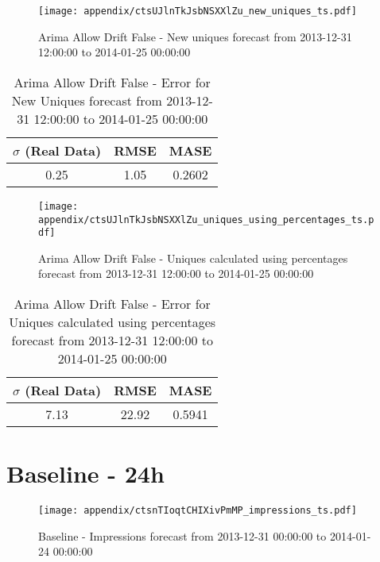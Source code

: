 \begin{figure}[H] \begin{center} \leavevmode
\texttt{[image: appendix/ctsUJlnTkJsbNSXXlZu\_new\_uniques\_ts.pdf]} \caption[]{
Arima Allow Drift False - New uniques forecast from 2013-12-31 12:00:00 to 2014-01-25 00:00:00} \label{fig:appendix/ctsUJlnTkJsbNSXXlZu_new_uniques_ts.pdf} \end{center}
\end{figure}

\begin{table}[H]
\centering
\footnotesize
\begin{tabular}{ccc}
$\sigma$ (Real Data) & RMSE & MASE   \\ \hline
0.25 & 1.05 & 0.2602 \\
\end{tabular}

\vspace{0.5cm}

\caption[]{
Arima Allow Drift False - Error for New Uniques forecast from 2013-12-31 12:00:00 to 2014-01-25 00:00:00}
\end{table}

\begin{figure}[H] \begin{center} \leavevmode
\texttt{[image: appendix/ctsUJlnTkJsbNSXXlZu\_uniques\_using\_percentages\_ts.pdf]} \caption[]{
Arima Allow Drift False - Uniques calculated using percentages forecast from 2013-12-31 12:00:00 to 2014-01-25 00:00:00} \label{fig:appendix/ctsUJlnTkJsbNSXXlZu_uniques_using_percentages_ts.pdf} \end{center}
\end{figure}

\begin{table}[H]
\centering
\footnotesize
\begin{tabular}{ccc}
$\sigma$ (Real Data) & RMSE & MASE   \\ \hline
7.13 & 22.92 & 0.5941 \\
\end{tabular}

\vspace{0.5cm}

\caption[]{
Arima Allow Drift False - Error for Uniques calculated using percentages forecast from 2013-12-31 12:00:00 to 2014-01-25 00:00:00}
\end{table}

\section{Baseline - 24h}
\begin{figure}[H] \begin{center} \leavevmode
\texttt{[image: appendix/ctsnTIoqtCHIXivPmMP\_impressions\_ts.pdf]} \caption[]{
Baseline - Impressions forecast from 2013-12-31 00:00:00 to 2014-01-24 00:00:00} \label{fig:appendix/ctsnTIoqtCHIXivPmMP_impressions_ts.pdf} \end{center}
\end{figure}

